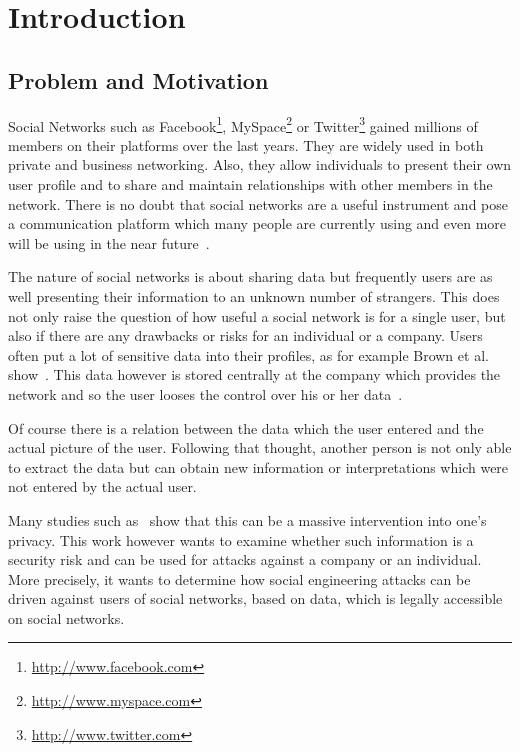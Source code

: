 \chapter{Introduction}
\label{chap:introduction}

\section{Problem and Motivation}

Social Networks such as Facebook\footnote{\url{http://www.facebook.com}},
MySpace\footnote{\url{http://www.myspace.com}} or
Twitter\footnote{\url{http://www.twitter.com}} gained millions of members on
their platforms over the last years. They are widely used in both private and
business networking. Also, they allow individuals to present their own user
profile and to share and maintain relationships with other members in the
network. There is no doubt that social networks are a useful instrument and
pose a communication platform which many people are currently using and even
more will be using in the near future~\cite{whitworth2009}.

The nature of social networks is about sharing data but frequently users are as
well presenting their information to an unknown number of strangers. This does
not only raise the question of how useful a social network is for a single
user, but also if there are any drawbacks or risks for an individual or a
company. Users often put a lot of sensitive data into their
profiles, as for example Brown et al. show~\cite{brown2008}. This data however
is stored centrally at the company which provides the network and so the user
looses the control over his or her data~\cite{fraunhofer2008}.

Of course there is a relation between the data which the user entered and the
actual picture of the user. Following that thought, another person is not only
able to extract the data but can obtain new information or interpretations
which were not entered by the actual user.

Many studies such as~\cite{fraunhofer2008,gross2005} show that this can be a
massive intervention into one's privacy. This work however wants to examine
whether such information is a security risk and can be used for attacks
against a company or an individual. More precisely, it wants to determine how
social engineering attacks can be driven against users of social networks,
based on data, which is legally accessible on social networks.

